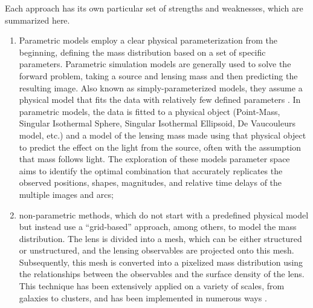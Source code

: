 Each approach has its own particular set of strengths and weaknesses, which are summarized here.
\begin{enumerate}

    \item Parametric models employ a clear physical parameterization from the beginning, defining the mass distribution based on a set of specific parameters. Parametric simulation models are generally used to solve the forward problem, taking a source and lensing mass and then predicting the resulting image. Also known as simply-parameterized models, they assume a physical model that fits the data with relatively few defined parameters \citep{jullo_bayesian_2007}. In parametric models, the data is fitted to a physical object (\eg Point-Mass, Singular Isothermal Sphere, Singular Isothermal Ellipsoid, De Vaucouleurs model, etc.) and a model of the lensing mass made using that physical object to predict the effect on the light from the source, often with the assumption that mass follows light. The exploration of these models parameter space aims to identify the optimal combination that accurately replicates the observed positions, shapes, magnitudes, and relative time delays of the multiple images and arcs;

    \item non-parametric methods, which do not start with a predefined physical model but instead use a ``grid-based'' approach, among others, to model the mass distribution. The lens is divided into a mesh, which can be either structured or unstructured, and the lensing observables are projected onto this mesh. Subsequently, this mesh is converted into a pixelized mass distribution using the relationships between the observables and the surface density of the lens. This technique has been extensively applied on a variety of scales, from galaxies to clusters, and has been implemented in numerous ways \citep{birrer_gravitational_2015,blandford_modeling_2000,coles_gravitational_2014,diego_non-parametric_2005,diego_combined_2007,koopmans_gravitational_2005,liesenborgs_genetic_2006,merten_mesh-free_2016,saha_portable_2004,sebesta_testing_2016,suyu_anatomy_2006,suyu_dissecting_2009}.
\end{enumerate}


